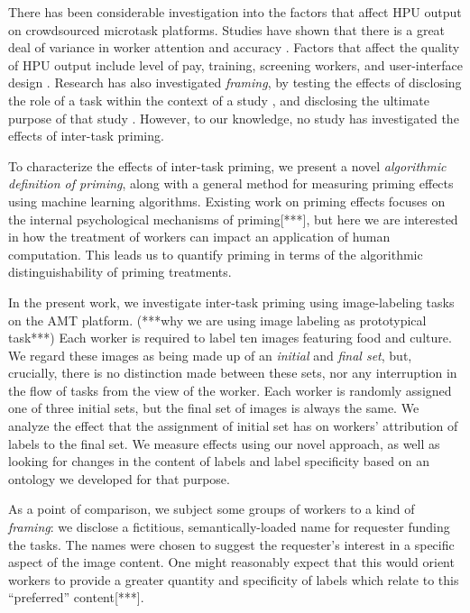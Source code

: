\documentclass[a4paper]{report}
\begin{document}
There has been considerable investigation into the factors that affect HPU 
output on crowdsourced microtask platforms.  Studies have shown that 
there is a great deal of variance in worker attention and 
accuracy \cite{kazai2013analysis}.  Factors that affect the quality of HPU 
output include level of pay\cite{kazai2013analysis}, 
training\cite{le2010ensuring}, screening workers\cite{paolacci2010running}, 
and user-interface design
\cite{Finnerty2013}.  Research has also investigated \textit{framing}, 
by testing the effects of disclosing the role of a task within the 
context of a study \cite{Kinnaird2012281}, and disclosing the ultimate 
purpose of that study \cite{chandler2013breaking}.  However, to our knowledge, 
no study has investigated the effects of inter-task priming.

To characterize the effects of inter-task priming, we present a novel  
\textit{algorithmic definition of priming}, along with a general method 
for measuring priming effects using machine learning algorithms.  
Existing work on priming effects focuses on the internal psychological 
mechanisms of priming[***], but here we are interested in how the treatment of 
workers can impact an application of human computation. This leads us to 
quantify priming in terms of the algorithmic distinguishability of priming
treatments.

In the present work, we investigate inter-task priming using image-labeling 
tasks on the AMT platform.  
(***why we are using image labeling as prototypical task***) 
Each worker is required to label ten images 
featuring 
food and culture.  We regard these images as being made up of an 
\textit{initial} and \textit{final set}, but, crucially, there is no
distinction made between these sets, nor any interruption in the flow of tasks 
from the view of the worker.
Each worker is randomly assigned one of three initial sets, but the final set
of images is always the same.  We analyze the effect that the assignment of 
initial set has on workers' attribution of labels to the final set.  We 
measure effects using our novel approach, as well as looking for changes in 
the content of labels and label specificity based on an ontology we 
developed for that purpose.

As a point of comparison, we subject some groups of workers to a kind of
\textit{framing}: we disclose a fictitious, semantically-loaded name for 
requester funding the tasks.
The names were chosen to suggest the requester's interest in 
a specific aspect of the image content.  One might reasonably expect that this 
would orient workers to provide a greater quantity and specificity of labels 
which relate to this ``preferred'' content[***].
\end{document}
